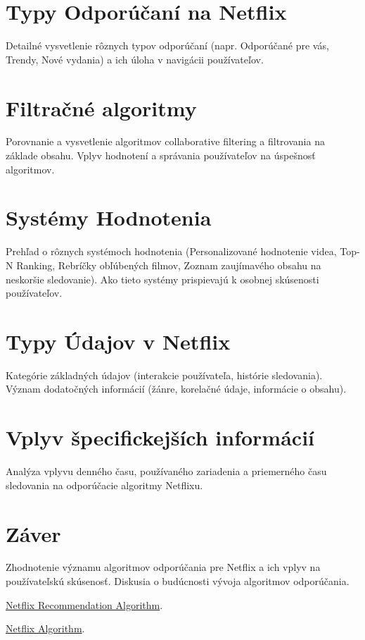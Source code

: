 \documentclass[10pt,twoside,slovak,a4paper]{article}
\begin{document}
\section{Typy Odporúčaní na Netflix}
Detailné vysvetlenie rôznych typov odporúčaní (napr. Odporúčané pre vás, Trendy, Nové vydania) a ich úloha v navigácii používateľov.

\section{Filtračné algoritmy}
Porovnanie a vysvetlenie algoritmov collaborative filtering a filtrovania na základe obsahu.
Vplyv hodnotení a správania používateľov na úspešnosť algoritmov.

\section{Systémy Hodnotenia}
Prehľad o rôznych systémoch hodnotenia (Personalizované hodnotenie videa, Top-N Ranking, Rebríčky obľúbených filmov, Zoznam zaujímavého obsahu na neskoršie sledovanie).
Ako tieto systémy prispievajú k osobnej skúsenosti používateľov.

\section{Typy Údajov v Netflix}
Kategórie základných údajov (interakcie používateľa, histórie sledovania).
Význam dodatočných informácií (žánre, korelačné údaje, informácie o obsahu).

\section{Vplyv špecifickejších informácií}
Analýza vplyvu denného času, používaného zariadenia a priemerného času sledovania na odporúčacie algoritmy Netflixu.

\section{Záver}
Zhodnotenie významu algoritmov odporúčania pre Netflix a ich vplyv na používateľskú skúsenosť.
Diskusia o budúcnosti vývoja algoritmov odporúčania.
\begin{thebibliography}{9}

\href{https://stratoflow.com/how-netflix-recommendation-algorithm-work/}{Netflix Recommendation Algorithm}.  

\href{https://recostream.com/blog/recommendation-system-netflix}{Netflix Algorithm}.  

\end{thebibliography}
\end{document}

